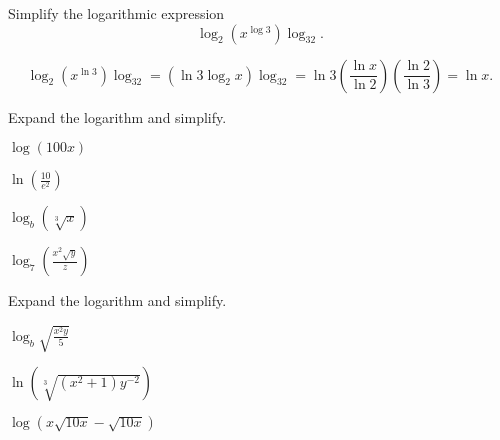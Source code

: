 	\begin{example}
		Simplify the logarithmic expression
		$$
		\log_2(x^{\log 3})\log_32.
		$$
	\end{example}
	\begin{solution}
		\[
			\log_2(x^{\ln 3})\log_32
			=(\ln 3\log_2x)\log_32=\ln3\left(\frac{\ln x}{\ln 2}\right)\left(\frac{\ln 2}{\ln 3}\right)=\ln x.
		\]
	\end{solution}

\newpage

\begin{exercise}
	Expand the logarithm and simplify.\\
	\noindent
	\begin{enumerate*}[label={(\arabic*)~}]
		\item $\log(100x)$
		\item $\ln\left(\frac{10}{e^2}\right)$
		\item $\log_b(\sqrt[3]{x})$
		\item $\log_7(\frac{x^2\sqrt{y}}{z})$
	\end{enumerate*}
\end{exercise}

\vfill
\begin{center} \hfill
\end{center}

\begin{exercise}
	Expand the logarithm and simplify.\\
	\noindent
	\begin{enumerate*}[label={(\arabic*)~}]
		\item $\log_b\sqrt{\frac{x^2y}{5}}$
		\item $\ln(\sqrt[3]{(x^2+1)y^{-2}})$
		\item $\log(x\sqrt{10x}-\sqrt{10x})$
		\hfill\null
	\end{enumerate*}
\end{exercise}


